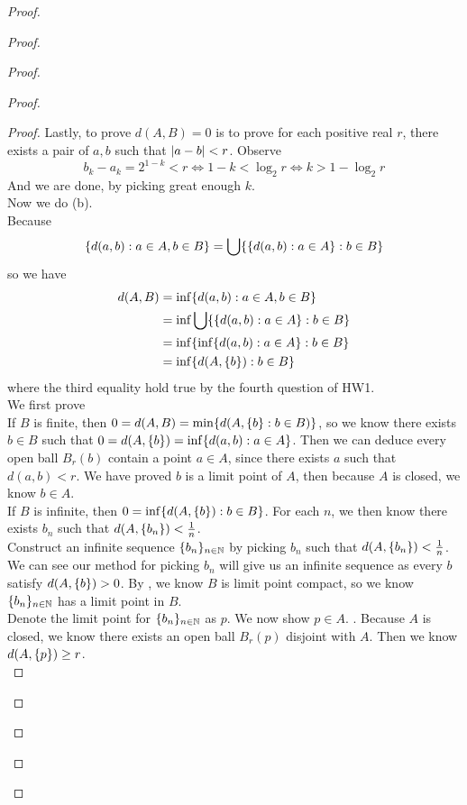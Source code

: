 \documentclass{report}
\begin{document}
\begin{proof}
\begin{proof}
\begin{proof}
\begin{proof}
\begin{proof}
Lastly, to prove $d(A,B)=0$ is to prove for each positive real $r$, there exists a pair of $a,b$ such that  $|a-b|<r$. Observe
 \begin{equation}
b_k-a_k=2^{1-k}<r\iff 1-k<\log_2 r\iff k>1-\log_2 r
\end{equation}
And we are done, by picking great enough $k$.\\



Now we do (b).\\

Because 
\begin{equation}
\{ d(a,b):a\in A,b\in B \}=\bigcup \{ \{ d(a,b):a\in A \}:b \in B \}
\end{equation}
so we have 
\begin{align}
d(A,B)&=\inf \{ d(a,b):a\in A,b\in B \}\\
&=\inf \bigcup \{ \{ d(a,b):a\in A \}:b\in B \}\\
&=\inf \{ \inf \{ d(a,b):a\in A \}:b\in B \}\\
&=\inf \{ d(A,\{ b \}):b \in B \}
\end{align}
where the third equality hold true by the fourth question of HW1.\\


We first prove \\

If $B$ is finite, then  $0=d(A,B)=\min \{ d(A,\{ b \}:b\in B) \}$, so we know there exists $b\in B$ such that $0=d(A,\{ b \})=\inf \{ d(a,b):a\in A \}$. Then we can deduce every open ball $B_r(b)$ contain a point $a\in A$, since there exists $a$ such that  $d(a,b)<r$. We have proved $b$ is a limit point of $A$, then because  $A$ is closed, we know  $b\in A$.\\

If $B$ is infinite, then  $0=\inf \{ d(A,\{ b \}):b\in B \}$. For each $n$, we then know there exists  $b_n$ such that  $d(A,\{ b_n \})<\frac{1}{n}$.\\


Construct an infinite sequence $\{ b_n \}_{n\in\mathbb{N}}$ by picking $b_n$ such that $d(A,\{ b_n \})<\frac{1}{n}$. We can see our method for picking $b_n$ will give us an infinite sequence as every $b$  satisfy  $d(A,\{ b \})>0$. By , we know $B$ is limit point compact, so we know $\{ b_n \}_{n\in\mathbb{N}}$ has a limit point in $B$.\\

Denote the limit point for $\{ b_n \}_{n\in\mathbb{N}}$ as $p$. We now show $p\in A$. . Because $A$ is closed, we know there exists an open ball  $B_r(p)$ disjoint with $A$. Then we know $d(A,\{ p \})\geq r$. \\


\end{proof}
\end{proof}
\end{proof}
\end{proof}
\end{proof}
\end{document}
